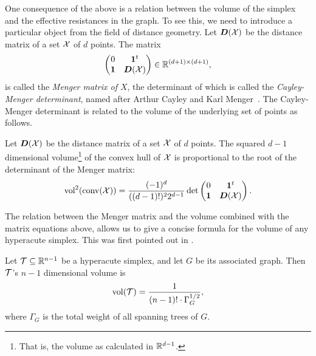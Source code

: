 One consequence of the above is a relation between the volume of the simplex and the effective resistances in the graph. To see this, we need to introduce a particular object from the field of distance geometry. Let $\vb*{D}(\mathcal{X})$ be the distance matrix of a set $\mathcal{X}$ of $d$ points. The matrix 
\begin{equation}
\label{eq:menger_matrix}
\begin{pmatrix}
0 & \vb{1}^t \\
\vb{1} & \vb*{D}(\mathcal{X})
\end{pmatrix}\in\mathbb{R}^{(d+1)\times (d+1)},
\end{equation}
is called the \emph{Menger matrix of $X$}, the determinant of which is called the \emph{Cayley-Menger determinant}, named after Arthur Cayley and Karl Menger~\cite{cayley1841theorem, Menger1928}. The Cayley-Menger determinant is related to the volume of the underlying set of points as follows. 


\begin{lemma}
	\label{lem:menger_volume}
	Let $\vb*{D}(\mathcal{X})$ be the distance matrix of a set $\mathcal{X}$ of $d$ points. The squared $d-1$ dimensional volume\footnote{That is, the volume as calculated in $\mathbb{R}^{d-1}$.} of the convex hull of $\mathcal{X}$ is proportional to the root of the determinant of the Menger matrix: 
	\begin{equation}
	\label{eq:vol(convX)}
	\textnormal{vol}^2(\textnormal{conv}(\mathcal{X})) = \frac{(-1)^d}{((d-1)!)^2 2^{d-1}} \det\begin{pmatrix}
	0 & \vb{1}^t \\
	\vb{1} & \vb*{D}(\mathcal{X})
	\end{pmatrix}.
	\end{equation} 
\end{lemma}

The relation between the Menger matrix and the volume combined with the matrix equations above, allows us to give a concise formula for the volume of any hyperacute simplex. This was first pointed out in \cite{van2017pseudoinverse}. 

\begin{lemma}
	\label{lem:volume}
	Let $\mathcal{T}\subseteq\mathbb{R}^{n-1}$ be a hyperacute simplex, and let $G$ be its associated graph. Then $\mathcal{T}$'s $n-1$ dimensional volume is 
	\begin{equation}
	\label{eq:vol(T)}
	\textnormal{vol}(\mathcal{T}) = \frac{1}{(n-1)!\cdot \Gamma_G^{1/2}},
	\end{equation}
	where $\Gamma_G$ is the total weight of all spanning  trees of $G$. 
\end{lemma}

